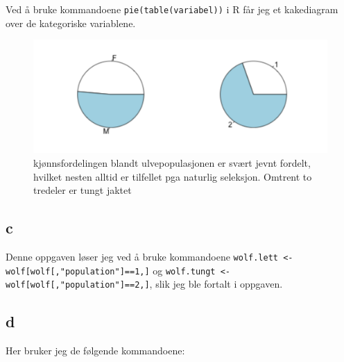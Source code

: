 Ved å bruke kommandoene \texttt{pie(table(variabel))} i R får jeg et kakediagram over de kategoriske variablene. 

\begin{figure}[H]
        \centering
        \includegraphics[width=0.7\linewidth]{wolf_sex.png}
        \caption{kjønnsfordelingen blandt ulvepopulasjonen er svært jevnt fordelt, hvilket nesten alltid er tilfellet pga naturlig seleksjon. Omtrent to tredeler er tungt jaktet}
        \label{fig:sex_population}
\end{figure}

\subsection*{c}

Denne oppgaven løser jeg ved å bruke kommandoene \texttt{wolf.lett <- wolf[wolf[,"population"]==1,]} og \texttt{wolf.tungt <- wolf[wolf[,"population"]==2,]}, slik jeg ble fortalt i oppgaven.

\subsection*{d}
Her bruker jeg de følgende kommandoene:

